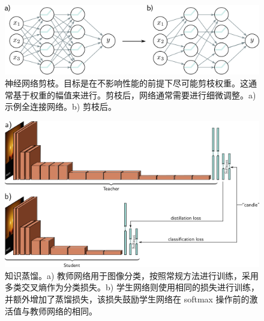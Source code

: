 \begin{figure}[ht!]
\centering
\includegraphics[width=0.7\linewidth]{png/chapter20/WhyPruning.png}
\caption{神经网络剪枝。目标是在不影响性能的前提下尽可能剪枝权重。这通常基于权重的幅值来进行。剪枝后，网络通常需要进行细微调整。a) 示例全连接网络。b) 剪枝后。}
\end{figure}


\begin{figure}[ht!]
\centering
\includegraphics[width=0.7\linewidth]{png/chapter20/WhyDistill.png}
\caption{知识蒸馏。a) 教师网络用于图像分类，按照常规方法进行训练，采用多类交叉熵作为分类损失。b) 学生网络则使用相同的损失进行训练，并额外增加了蒸馏损失，该损失鼓励学生网络在 softmax 操作前的激活值与教师网络的相同。}
\end{figure}

